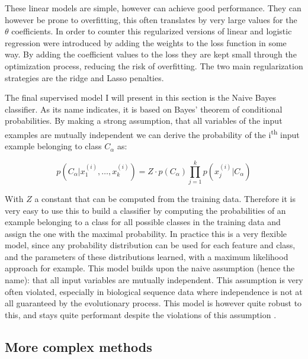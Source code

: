 \documentclass[
  11pt,
  twoside,
  BCOR=10mm,
  listof=totoc]{scrbook}
\begin{document}
These linear models are simple, however can achieve good performance. They can however be prone to overfitting, this often translates by very large values for the \(\theta\) coefficients. In order to counter this regularized versions of linear and logistic regression were introduced by adding the weights to the loss function in some way. By adding the coefficient values to the loss they are kept small through the optimization process, reducing the risk of overfitting. The two main regularization strategies are the ridge \autocite{hoerlRidgeRegressionBiased1970} and Lasso \autocite{tibshiraniRegressionShrinkageSelection1996} penalties.

The final supervised model I will present in this section is the Naive Bayes classifier. As its name indicates, it is based on Bayes' theorem of conditional probabilities. By making a strong assumption, that all variables of the input examples are mutually independent we can derive the probability of the i\textsuperscript{th} input example belonging to class \(C_{\alpha}\) as:

\begin{equation}
p(C_{\alpha} | x^{(i)}_1, \ldots, x^{(i)}_k) = Z \cdot p(C_{\alpha}) \prod_{j=1}^k p(x^{(i)}_j | C_{\alpha})
\end{equation}

With \(Z\) a constant that can be computed from the training data. Therefore it is very easy to use this to build a classifier by computing the probabilities of an example belonging to a class for all possible classes in the training data and assign the one with the maximal probability. In practice this is a very flexible model, since any probability distribution can be used for each feature and class, and the parameters of these distributions learned, with a maximum likelihood approach for example. This model builds upon the naive assumption (hence the name): that all input variables are mutually independent. This assumption is very often violated, especially in biological sequence data where independence is not at all guaranteed by the evolutionary process. This model is however quite robust to this, and stays quite performant despite the violations of this assumption \autocite{zhangOptimalityNaiveBayes,rishEmpiricalStudyNaive}.

\hypertarget{more-complex-methods}{%
\subsection{More complex methods}\label{more-complex-methods}}
\end{document}
